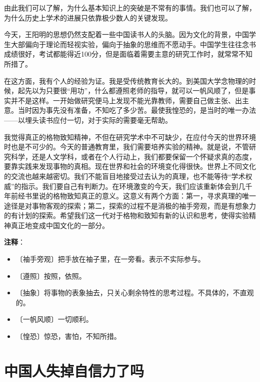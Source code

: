 \documentclass[12pt,UTF-8,openany]{ctexbook}
\begin{document}
\begin{normalsize}
    由此我们可以了解，为什么基本知识上的突破是不常有的事情。我们也可以了解，为什么历史上学术的进展只依靠极少数人的关键发现。
    
    今天，王阳明的思想仍然支配着一些中国读书人的头脑。因为文化的背景，中国学生大部偏向于理论而轻视实验，偏向于抽象的思维而不愿动手。中国学生往往念书成绩很好，考试都能得近100分，但是面临着需要主意的研究工作时，就常常不知所措了。
    
    在这方面，我有个人的经验为证。我是受传统教育长大的。到美国大学念物理的时候，起先以为只要很“用功”，什么都遵照老师的指导，就可以一帆风顺了，但是事实并不是这样。一开始做研究便马上发现不能光靠教师，需要自己做主张、出主意。当时因为事先没有准备，不知吃了多少苦。最使我惶恐的，是当时的唯一办法——以埋头读书应付一切，对于实际的需要毫无帮助。
    
    我觉得真正的格物致知精神，不但在研究学术中不可缺少，在应付今天的世界环境时也是不可少的。今天的普通教育里，我们需要培养实验的精神。就是说，不管研究科学，还是人文学科，或者在个人行动上，我们都要保留一个怀疑求真的态度，要靠实践来发现事物的真相。现在世界和社会的环境变化得很快。世界上不同文化的交流也越来越密切。我们不能盲目地接受过去认为的真理，也不能等待“学术权威”的指示。我们要自己有判断力。在环境激变的今天，我们应该重新体会到几千年前经书里说的格物致知真正的意义。这意义有两个方面：第一，寻求真理的唯一途径是对事物客观的探索；第二，探索的过程不是消极的袖手旁观，而是有想象力的有计划的探索。希望我们这一代对于格物和致知有新的认识和思考，使得实验精神真正地变成中国文化的一部分。
    
\end{normalsize}


\newpage

\textbf{注释}：

\vspace{-1em}

\begin{itemize}
    \setlength\itemsep{-0.2em}
    \item 〔袖手旁观〕把手放在袖子里，在一旁看。表示不实际参与。
    \item 〔遵照〕按照，依照。
    \item 〔抽象〕将事物的表象抽去，只关心剩余特性的思考过程。不具体的，不直观的。
    \item 〔一帆风顺〕一切顺利。
    \item 〔惶恐〕惊恐，害怕，不知所措。
\end{itemize}

\chapter{中国人失掉自信力了吗}
\end{document}
